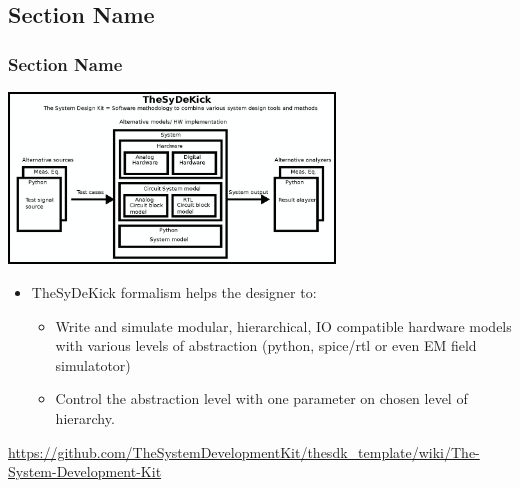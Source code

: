 \documentclass{sdkslides}
\newcommand{\sectname}{Section Name}
\begin{document}
\subsection*{\sectname}
\begin{frame}[t]
    \frametitle{\sectname}
    \centering
        \includegraphics[width=0.65\textwidth]{Pics/TheSDK_block_diagram.eps}
        \begin{itemize}
            \item TheSyDeKick formalism helps the designer to: 
            \begin{itemize}
                \item Write and simulate modular, hierarchical, IO compatible
                    hardware models with various levels of abstraction (python,
                    spice/rtl or even EM field simulatotor)
                \item Control the abstraction level with one parameter on
                    chosen level of hierarchy.
            \end{itemize}
        \end{itemize}
        {\tiny
        \url{https://github.com/TheSystemDevelopmentKit/thesdk_template/wiki/The-System-Development-Kit}}
\end{frame}


\renewcommand{\sectname}{What is it?}
\end{document}
